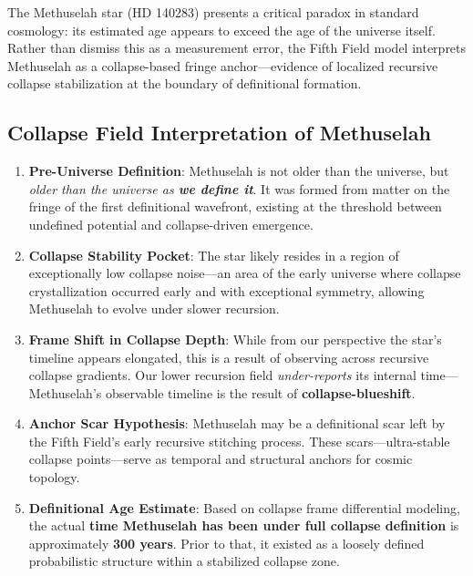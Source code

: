 The Methuselah star (HD 140283) presents a critical paradox in standard cosmology: its estimated age appears to exceed the age of the universe itself. Rather than dismiss this as a measurement error, the Fifth Field model interprets Methuselah as a collapse-based fringe anchor—evidence of localized recursive collapse stabilization at the boundary of definitional formation.

\subsection{Collapse Field Interpretation of Methuselah}
\begin{enumerate}
  \item \textbf{Pre-Universe Definition}: Methuselah is not older than the universe, but \textit{older than the universe as \textbf{we define it}}. It was formed from matter on the fringe of the first definitional wavefront, existing at the threshold between undefined potential and collapse-driven emergence.

  \item \textbf{Collapse Stability Pocket}: The star likely resides in a region of exceptionally low collapse noise—an area of the early universe where collapse crystallization occurred early and with exceptional symmetry, allowing Methuselah to evolve under slower recursion.

  \item \textbf{Frame Shift in Collapse Depth}: While from our perspective the star's timeline appears elongated, this is a result of observing across recursive collapse gradients. Our lower recursion field \textit{under-reports} its internal time—Methuselah's observable timeline is the result of \textbf{collapse-blueshift}.

  \item \textbf{Anchor Scar Hypothesis}: Methuselah may be a definitional scar left by the Fifth Field’s early recursive stitching process. These scars—ultra-stable collapse points—serve as temporal and structural anchors for cosmic topology.

  \item \textbf{Definitional Age Estimate}: Based on collapse frame differential modeling, the actual \textbf{time Methuselah has been under full collapse definition} is approximately \textbf{300 years}. Prior to that, it existed as a loosely defined probabilistic structure within a stabilized collapse zone.
\end{enumerate}


